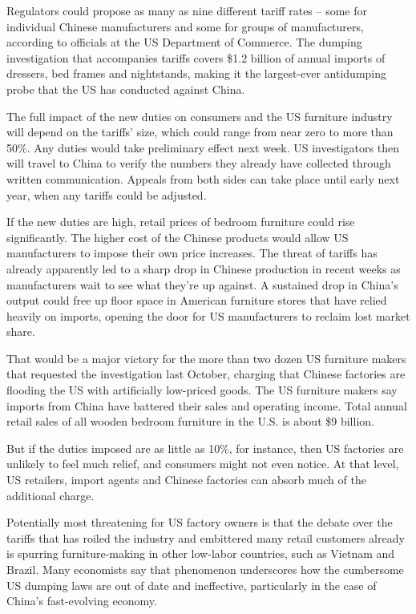 \documentclass[letterpaper,12pt]{article}
\begin{document}
Regulators could propose as many as nine different tariff rates -- some for individual Chinese manufacturers and some for groups of manufacturers, according to officials at the US Department of Commerce. The dumping investigation that accompanies tariffs covers \$1.2 billion of annual imports of dressers, bed frames and nightstands, making it the largest-ever antidumping probe that the US has conducted against China.

The full impact of the new duties on consumers and the US furniture industry will depend on the tariffs' size, which could range from near zero to more than 50\%. Any duties would take preliminary effect next week. US investigators then will travel to China to verify the numbers they already have collected through written communication. Appeals from both sides can take place until early next year, when any tariffs could be adjusted.

If the new duties are high, retail prices of bedroom furniture could rise significantly. The higher cost of the Chinese products would allow US manufacturers to impose their own price increases. The threat of tariffs has already apparently led to a sharp drop in Chinese production in recent weeks as manufacturers wait to see what they're up against. A sustained drop in China's output could free up floor space in American furniture stores that have relied heavily on imports, opening the door for US manufacturers to reclaim lost market share.

That would be a major victory for the more than two dozen US furniture makers that requested the investigation last October, charging that Chinese factories are flooding the US with artificially low-priced goods. The US furniture makers say imports from China have battered their sales and operating income. Total annual retail sales of all wooden bedroom furniture in the U.S. is about \$9 billion.

But if the duties imposed are as little as 10\%, for instance, then US factories are unlikely to feel much relief, and consumers might not even notice. At that level, US retailers, import agents and Chinese factories can absorb much of the additional charge.

Potentially most threatening for US factory owners is that the debate over the tariffs that has roiled the industry and embittered many retail customers already is spurring furniture-making in other low-labor countries, such as Vietnam and Brazil. Many economists say that phenomenon underscores how the cumbersome US dumping laws are out of date and ineffective, particularly in the case of China's fast-evolving economy.
\end{document}
